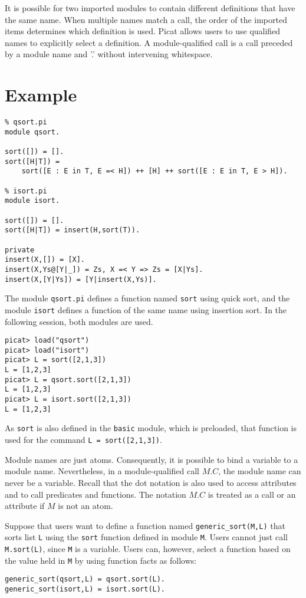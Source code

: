 It is possible for two imported modules to contain different definitions that have the same name. When multiple names match a call, the order of the imported items determines which definition is used. Picat allows users to use qualified names to explicitly select a definition. A module-qualified call is a call preceded by a module name and '.' without intervening whitespace. 

\section*{Example}
\begin{verbatim}
% qsort.pi
module qsort.

sort([]) = [].
sort([H|T]) = 
    sort([E : E in T, E =< H]) ++ [H] ++ sort([E : E in T, E > H]).

% isort.pi
module isort.

sort([]) = [].
sort([H|T]) = insert(H,sort(T)).

private
insert(X,[]) = [X].
insert(X,Ys@[Y|_]) = Zs, X =< Y => Zs = [X|Ys].
insert(X,[Y|Ys]) = [Y|insert(X,Ys)].
\end{verbatim}
The module \texttt{qsort.pi} defines a function named \texttt{sort} using quick sort, and the module \texttt{isort} defines a function of the same name using insertion sort. In the following session, both modules are used.
\begin{verbatim}
picat> load("qsort")
picat> load("isort")
picat> L = sort([2,1,3])
L = [1,2,3]
picat> L = qsort.sort([2,1,3])
L = [1,2,3]
picat> L = isort.sort([2,1,3])
L = [1,2,3]
\end{verbatim}
As \texttt{sort} is also defined in the \texttt{basic} module, which is preloaded, that function is used for the command \texttt{L = sort([2,1,3])}.

Module names are just atoms. Consequently, it is possible to bind a variable to a module name. Nevertheless, in a module-qualified call $M.C$, the module name can never be a variable. Recall that the dot notation is also used to access attributes and to call predicates and functions. The notation $M.C$ is treated as a call or an attribute if $M$ is not an atom.

Suppose that users want to define a function named \texttt{generic\_sort(M,L)} that sorts list \texttt{L} using the \texttt{sort} function defined in module \texttt{M}. Users cannot just call \texttt{M.sort(L)}, since \texttt{M} is a variable. Users can, however, select a function based on the value held in \texttt{M} by using function facts as follows:
\begin{verbatim}
generic_sort(qsort,L) = qsort.sort(L).
generic_sort(isort,L) = isort.sort(L).
\end{verbatim}

